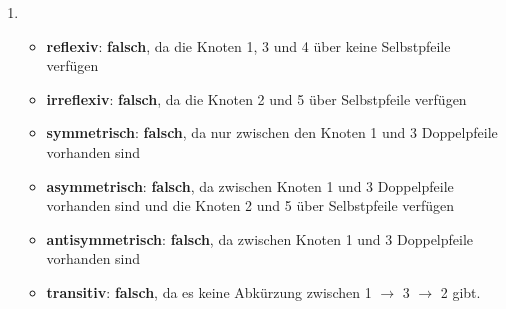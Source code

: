 \documentclass[a4paper]{article}
\begin{document}
\begin{enumerate}
\begin{enumerate}
			\item
			\begin{itemize}
				\item \textbf{reflexiv}: \textbf{falsch}, da die Knoten 1, 3 und 4 über keine Selbstpfeile verfügen
				\item \textbf{irreflexiv}: \textbf{falsch}, da die Knoten 2 und 5 über Selbstpfeile verfügen
				\item \textbf{symmetrisch}: \textbf{falsch}, da nur zwischen den Knoten 1 und 3 Doppelpfeile vorhanden sind
				\item \textbf{asymmetrisch}: \textbf{falsch}, da zwischen Knoten 1 und 3 Doppelpfeile vorhanden sind und die Knoten 2 und 5 über Selbstpfeile verfügen
				\item \textbf{antisymmetrisch}: \textbf{falsch}, da zwischen Knoten 1 und 3 Doppelpfeile vorhanden sind
				\item \textbf{transitiv}: \textbf{falsch}, da es keine Abkürzung zwischen 1 $\rightarrow$ 3 $\rightarrow$ 2 gibt.
			\end{itemize}
		\end{enumerate}
		

\end{enumerate}
\end{document}
